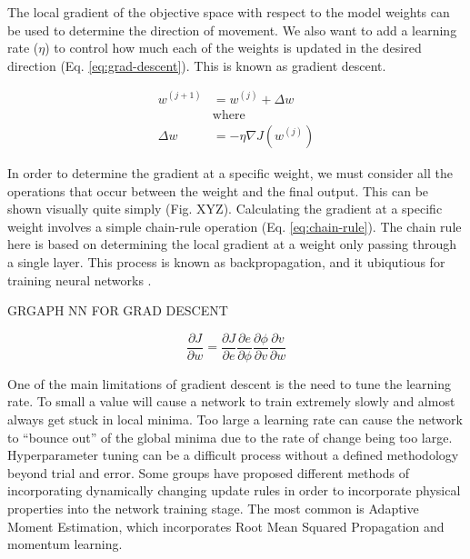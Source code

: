 The local gradient of the objective space with respect to the model weights can be used to determine the direction of movement. We also want to add a learning rate ($\eta$) to control how much each of the weights is updated in the desired direction (Eq. \ref{eq:grad-descent}). This is known as gradient descent.

\begin{equation}
    \begin{aligned}
        w^{(j+1)} &= w^{(j)} + \Delta w\\
        &\text{where} \\
        \Delta w &= -\eta \nabla J(w^{(j)})
    \end{aligned}
    \label{eq:grad-descent}
\end{equation}

In order to determine the gradient at a specific weight, we must consider all the operations that occur between the weight and the final output. This can be shown visually quite simply (Fig. XYZ). Calculating the gradient at a specific weight involves a simple chain-rule operation (Eq. \ref{eq:chain-rule}). The chain rule here is based on determining the local gradient at a weight only passing through a single layer. This process is known as backpropagation, and it ubiqutious for training neural networks \cite{rumelhartLearningRepresentationsBackpropagating1986}.

\begin{center}
    \Large{GRGAPH NN FOR GRAD DESCENT}
\end{center}

\begin{equation}
    \frac{\partial J}{\partial w} = \frac{\partial J}{\partial e}\frac{\partial e}{\partial \phi}\frac{\partial \phi}{\partial v} \frac{\partial v}{\partial w}
    \label{eq:chain-rule}
\end{equation}

One of the main limitations of gradient descent is the need to tune the learning rate. To small a value will cause a network to train extremely slowly and almost always get stuck in local minima. Too large a learning rate can cause the network to ``bounce out'' of the global minima due to the rate of change being too large. Hyperparameter tuning can be a difficult process without a defined methodology beyond trial and error. Some groups have proposed different methods of incorporating dynamically changing update rules in order to incorporate physical properties into the network training stage. The most common is Adaptive Moment Estimation, which incorporates Root Mean Squared Propagation \cite{hinton2012neural} and momentum learning. 